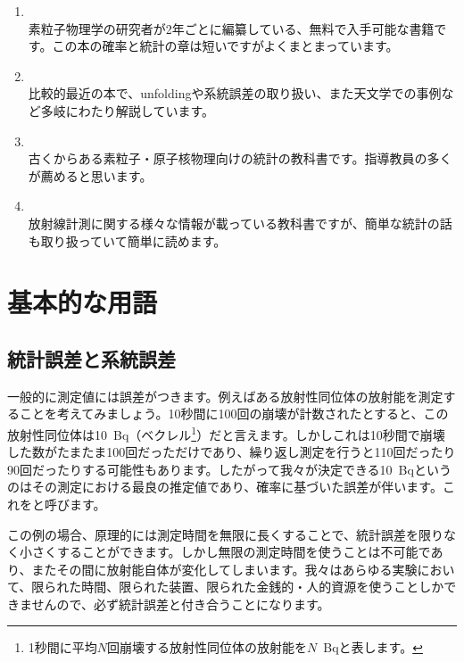 \begin{enumerate}
  \item {}\\
    素粒子物理学の研究者が2年ごとに編纂している、無料で入手可能な書籍です。この本の確率と統計の章は短いですがよくまとまっています。
  \item {}\\
    比較的最近の本で、unfoldingや系統誤差の取り扱い、また天文学での事例など多岐にわたり解説しています。
  \item {}\\
    古くからある素粒子・原子核物理向けの統計の教科書です。指導教員の多くが薦めると思います。
  \item {}\\
    放射線計測に関する様々な情報が載っている教科書ですが、簡単な統計の話も取り扱っていて簡単に読めます。
\end{enumerate}

\section{基本的な用語}

\subsection{統計誤差と系統誤差}

一般的に測定値には誤差がつきます。例えばある放射性同位体の放射能を測定することを考えてみましょう。10秒間に100回の崩壊が計数されたとすると、この放射性同位体は10~Bq（ベクレル\footnote{1秒間に平均$N$回崩壊する放射性同位体の放射能を$N$~Bqと表します。}）だと言えます。しかしこれは10秒間で崩壊した数がたまたま100回だっただけであり、繰り返し測定を行うと110回だったり90回だったりする可能性もあります。したがって我々が決定できる10~Bqというのはその測定における最良の推定値であり、確率に基づいた誤差が伴います。これをと呼びます。

この例の場合、原理的には測定時間を無限に長くすることで、統計誤差を限りなく小さくすることができます。しかし無限の測定時間を使うことは不可能であり、またその間に放射能自体が変化してしまいます。我々はあらゆる実験において、限られた時間、限られた装置、限られた金銭的・人的資源を使うことしかできませんので、必ず統計誤差と付き合うことになります。

